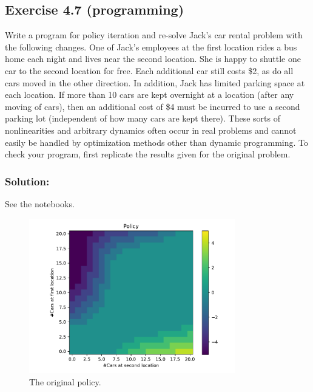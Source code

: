 \subsection*{Exercise 4.7 (programming)}
Write a program for policy iteration and re-solve Jack's car
rental problem with the following changes. One of Jack's employees at the first location
rides a bus home each night and lives near the second location. She is happy to shuttle
one car to the second location for free. Each additional car still costs \$2, as do all cars
moved in the other direction. In addition, Jack has limited parking space at each location.
If more than 10 cars are kept overnight at a location (after any moving of cars), then an
additional cost of \$4 must be incurred to use a second parking lot (independent of how
many cars are kept there). These sorts of nonlinearities and arbitrary dynamics often
occur in real problems and cannot easily be handled by optimization methods other than
dynamic programming. To check your program, first replicate the results given for the
original problem.

\subsubsection*{Solution:}

See the notebooks.

\begin{figure}[H]
    \centering
    \includegraphics[width=0.8\textwidth]{chapters_latex/figures/ex_04_07_original.pdf}
    \caption{The original policy.}
\end{figure}

